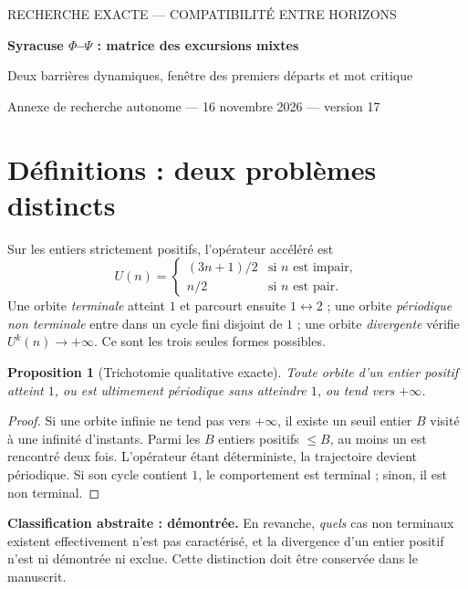 \documentclass[11pt,a4paper]{article}
\newtheorem{proposition}[theoreme]{Proposition}
\begin{document}
\begin{center}
{\small\sffamily\color{teal} RECHERCHE EXACTE --- COMPATIBILITÉ ENTRE HORIZONS}\par\vspace{9pt}
{\Large\bfseries\color{navy} Syracuse $\Phi$--$\Psi$ : matrice des excursions mixtes}\par\vspace{6pt}
{\large Deux barrières dynamiques, fenêtre des premiers départs et mot critique}\par\vspace{8pt}
{\small Annexe de recherche autonome --- 16 novembre 2026 --- version 17}
\end{center}
\vspace{4pt}
\noindent{}
\tableofcontents
\section{Définitions : deux problèmes distincts}
Sur les entiers strictement positifs, l'opérateur accéléré est
\[U(n)=\begin{cases}(3n+1)/2&\text{si }n\text{ est impair},\\n/2&\text{si }n\text{ est pair}.\end{cases}\]
Une orbite \emph{terminale} atteint $1$ et parcourt ensuite $1\leftrightarrow 2$ ; une orbite \emph{périodique non terminale} entre dans un cycle fini disjoint de $1$ ; une orbite \emph{divergente} vérifie $U^k(n)\to+\infty$. Ce sont les trois seules formes possibles.
\begin{proposition}[Trichotomie qualitative exacte]\label{prop:tri}
Toute orbite d'un entier positif atteint $1$, ou est ultimement périodique sans atteindre $1$, ou tend vers $+\infty$.
\end{proposition}
\begin{proof}
Si une orbite infinie ne tend pas vers $+\infty$, il existe un seuil entier $B$ visité à une infinité d'instants. Parmi les $B$ entiers positifs $\le B$, au moins un est rencontré deux fois. L'opérateur étant déterministe, la trajectoire devient périodique. Si son cycle contient $1$, le comportement est terminal ; sinon, il est non terminal.
\end{proof}
\textbf{Classification abstraite : démontrée.} En revanche, \emph{quels} cas non terminaux existent effectivement n'est pas caractérisé, et la divergence d'un entier positif n'est ni démontrée ni exclue. Cette distinction doit être conservée dans le manuscrit.
\end{document}
